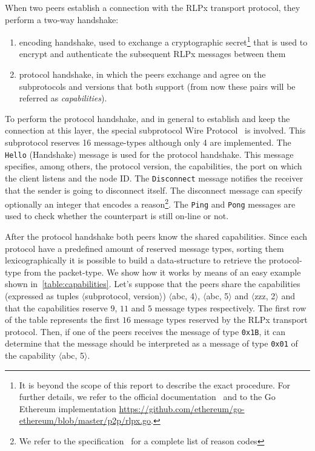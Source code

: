 When two peers establish a connection with the RLPx transport protocol, they
perform a two-way handshake:
\begin{enumerate}
  \item encoding handshake, used to exchange a cryptographic secret\footnote{It
  is beyond the scope of this report to describe the exact procedure. For
  further details, we refer to the official documentation~\cite{rlpx} and to the
  Go Ethereum implementation
  \url{https://github.com/ethereum/go-ethereum/blob/master/p2p/rlpx.go}.}
  that is used to encrypt and authenticate the subsequent RLPx messages between
  them
  \item protocol handshake, in which the peers exchange and agree on the
  subprotocols and versions that both support (from now these pairs will be
  referred as \emph{capabilities}).
\end{enumerate}

To perform the protocol handshake, and in general to establish and keep the
connection at this layer, the special subprotocol \devpp{} Wire
Protocol~\cite{devp2pwire} is involved. This subprotocol reserves 16
message-types although only 4 are implemented. The \verb+Hello+ (Handshake)
message is used for the protocol handshake. This message specifies, among
others, the protocol version, the capabilities, the port on which the client 
listens and the node ID. The \verb+Disconnect+ message notifies the receiver 
that the sender is going to disconnect itself. The disconnect message can 
specify optionally an integer that encodes a reason\footnote{We refer to the 
\devpp{} specification~\cite{devp2pwire} for a complete list of reason codes}. 
The \verb+Ping+ and \verb+Pong+ messages are used to check whether the 
counterpart is still on-line or not.

After the protocol handshake both peers know the shared capabilities. Since each
protocol have a predefined amount of reserved message types, sorting them
lexicographically it is possible to build a data-structure to retrieve the
protocol-type from the packet-type. We show how it works by means of an easy
example shown in~\autoref{table:capabilities}. Let's suppose that the peers
share the capabilities (expressed as tuples $\langle$subprotocol,
version$\rangle$) $\langle$abc, 4$\rangle$, $\langle$abc, 5$\rangle$ and
$\langle$zzz, 2$\rangle$ and that the capabilities reserve $9$, $11$ and $5$
message types respectively. The first row of the table represents the first $16$
message types reserved by the RLPx transport protocol. Then, if one of the peers
receives the message of type \texttt{0x1B}, it can determine that the message
should be interpreted as a message of type \texttt{0x01} of the capability
$\langle$abc, 5$\rangle$.

